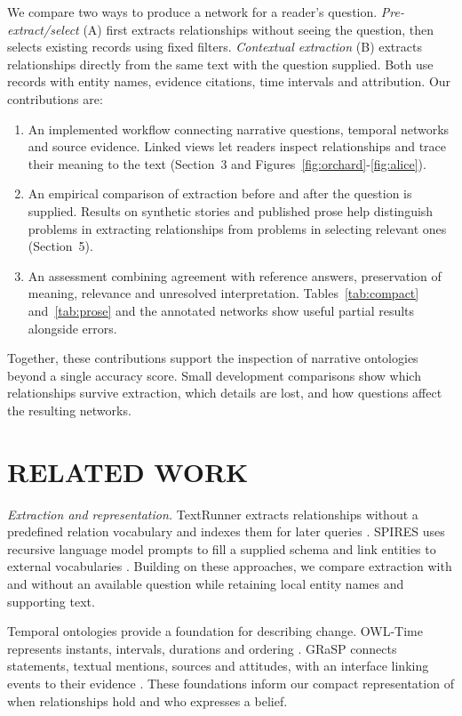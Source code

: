 \documentclass[a4paper,twoside]{article}
\begin{document}
We compare two ways to produce a network for a reader's question. \emph{Pre-extract/select} (A) first extracts relationships without seeing the question, then selects existing records using fixed filters. \emph{Contextual extraction} (B) extracts relationships directly from the same text with the question supplied. Both use records with entity names, evidence citations, time intervals and attribution. Our contributions are:

\begin{enumerate}
\item An implemented workflow connecting narrative questions, temporal networks and source evidence. Linked views let readers inspect relationships and trace their meaning to the text (Section~3 and Figures~\ref{fig:orchard}-\ref{fig:alice}).
\item An empirical comparison of extraction before and after the question is supplied. Results on synthetic stories and published prose help distinguish problems in extracting relationships from problems in selecting relevant ones (Section~5).
\item An assessment combining agreement with reference answers, preservation of meaning, relevance and unresolved interpretation. Tables~\ref{tab:compact} and~\ref{tab:prose} and the annotated networks show useful partial results alongside errors.
\end{enumerate}

Together, these contributions support the inspection of narrative ontologies beyond a single accuracy score. Small development comparisons show which relationships survive extraction, which details are lost, and how questions affect the resulting networks.

\OrchardFigure
\section{\uppercase{Related Work}}
\noindent \emph{Extraction and representation.} TextRunner extracts relationships without a predefined relation vocabulary and indexes them for later queries \cite{banko2007}. SPIRES uses recursive language model prompts to fill a supplied schema and link entities to external vocabularies \cite{caufield2024}. Building on these approaches, we compare extraction with and without an available question while retaining local entity names and supporting text.

Temporal ontologies provide a foundation for describing change. OWL-Time represents instants, intervals, durations and ordering \cite{time2017}. GRaSP connects statements, textual mentions, sources and attitudes, with an interface linking events to their evidence \cite{fokkens2017}. These foundations inform our compact representation of when relationships hold and who expresses a belief.
\end{document}
